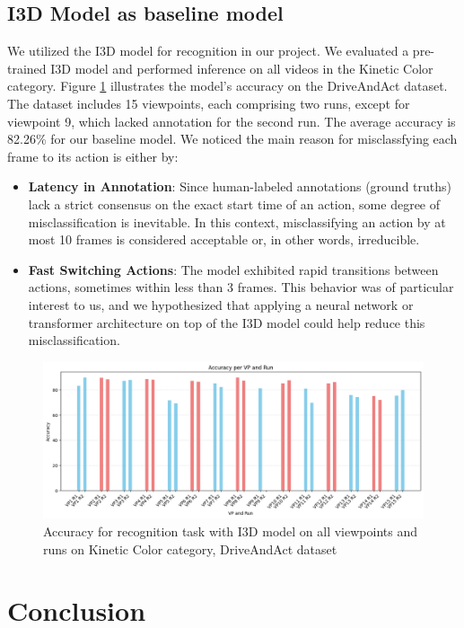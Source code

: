 \documentclass{article}
\begin{document}
\subsection{I3D Model as baseline model}
We utilized the I3D model for recognition in our project. We evaluated a pre-trained I3D model and performed inference on all videos in the Kinetic Color category. Figure \ref{fig:i3d-acc} illustrates the model's accuracy on the DriveAndAct dataset. The dataset includes 15 viewpoints, each comprising two runs, except for viewpoint 9, which lacked annotation for the second run. The average accuracy is 82.26\% for our baseline model.
We noticed the main reason for misclassfying each frame to its action is either by:
\begin{itemize}
    \item \textbf{Latency in Annotation}: Since human-labeled annotations (ground truths) lack a strict consensus on the exact start time of an action, some degree of misclassification is inevitable. In this context, misclassifying an action by at most 10 frames is considered acceptable or, in other words, irreducible.
    \item \textbf{Fast Switching Actions}: The model exhibited rapid transitions between actions, sometimes within less than 3 frames. This behavior was of particular interest to us, and we hypothesized that applying a neural network or transformer architecture on top of the I3D model could help reduce this misclassification.
\end{itemize}
\begin{figure}[h]
    \centering
    \includegraphics[width=0.8\linewidth]{i3d-acc.png}
    \caption{Accuracy for recognition task with I3D model on all viewpoints and runs on Kinetic Color category, DriveAndAct dataset}
    \label{fig:i3d-acc}
\end{figure}
\section{Conclusion}



\end{document}
